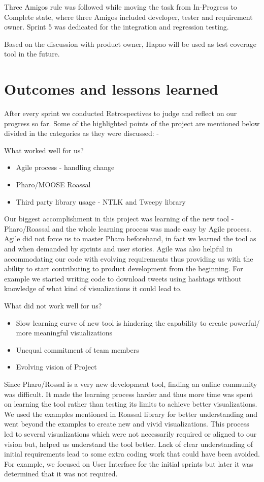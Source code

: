 \documentclass[11pt]{article}
\begin{document}
Three Amigos rule was followed while moving the task from In-Progress to Complete state, where three Amigos included developer, tester and requirement owner. Sprint 5 was dedicated for the integration and regression testing. 

Based on the discussion with product owner, Hapao will be used as test coverage tool in the future.

\section{Outcomes and lessons learned}
After every sprint we conducted Retrospectives to judge and reflect on our progress so far. Some of the highlighted points of the project are mentioned below divided in the categories as they were discussed: - 

What worked well for us? 
\begin{itemize}
\item Agile process - handling change
\item Pharo/MOOSE Roassal
\item Third party library usage - NTLK and Tweepy library
\end{itemize}

Our biggest accomplishment in this project was learning of the new tool - Pharo/Roassal and the whole learning process was made easy by Agile process. Agile did not force us to master Pharo beforehand, in fact we learned the tool as and when demanded by sprints and user stories. Agile was also helpful in accommodating our code with evolving requirements thus providing us with the ability to start contributing to product development from the beginning. For example we started writing code to download tweets using hashtags without knowledge of what kind of visualizations it could lead to.


What did not work well for us? 
\begin{itemize}
\item Slow learning curve of new tool is hindering the capability to create powerful/ more meaningful visualizations
\item Unequal commitment of team members
\item Evolving vision of Project
\end{itemize}
 
Since Pharo/Rossal is a very new development tool, finding an online community was difficult. It made the learning process harder and thus more time was spent on learning the tool rather than testing its limits to achieve better visualizations. We used the examples mentioned in Roassal library for better understanding and went beyond the examples to create new and vivid visualizations. This process led to several visualizations which were not necessarily required or aligned to our vision but, helped us understand the tool better\cite{GoogleSite}. Lack of clear understanding of initial requirements lead to some extra coding work that could have been avoided. For example, we focused on User Interface for the initial sprints but later it was determined that it was not required. 
\end{document}
